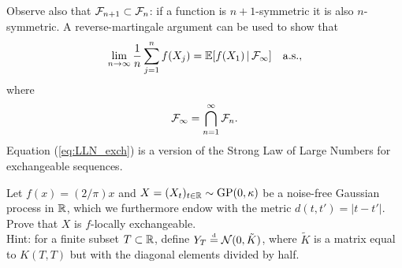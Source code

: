 \vskip 0.25cm

Observe also that $\mathcal{F}_{n+1} \subset \mathcal{F}_n$: if a function is $n+1$-symmetric it is also $n$-symmetric. A reverse-martingale argument \cite[see Theorem B.124 (Lévy's theorem: part II) in][p.~650]{Schervish:1995} can be used to show that
\begin{equation} \label{eq:LLN_exch}
	\lim_{n \to \infty} \frac{1}{n} \sum_{j=1}^n f(X_j) = \mathbb{E}[ f(X_1) \, | \, \mathcal{F}_{\infty}] \quad \mathrm{a.s.}, 
\end{equation}
where
\begin{equation*}
	\mathcal{F}_{\infty} = \bigcap_{n=1}^{\infty} \mathcal{F}_n.
\end{equation*}
Equation (\ref{eq:LLN_exch}) is a version of the Strong Law of Large Numbers for exchangeable sequences.

\vskip 0.75cm


\begin{exercise} \label{ex:GP_NF_local_exchangeable}
	Let $f(x) = (2/\pi) x$ and $X = (X_t)_{t \in \mathbb{R}} \sim \mathrm{GP} (0, \kappa)$ be a noise-free Gaussian process in $\mathbb{R}$, which we furthermore endow with the metric  $d(t, t') = |t-t'|$. Prove that $X$ is $f$-locally exchangeable. \\
	
	Hint: for a finite subset $T \subset \mathbb{R}$, define $Y_T \stackrel{\text{\rm\tiny d}}{=} \mathcal{N} ( 0, \tilde{K} )$, where $\tilde{K}$ is a matrix equal to $K(T, T)$ but with the diagonal elements divided by half.
\end{exercise}


